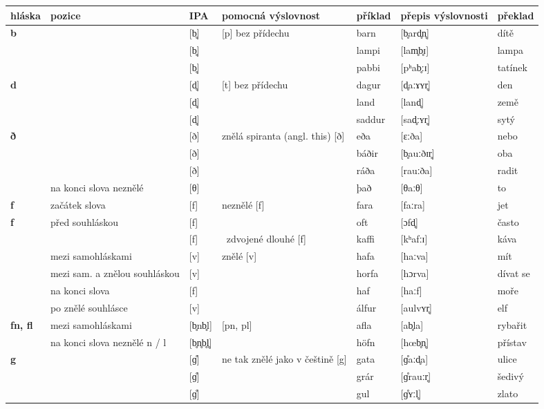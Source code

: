 \begin{longtable}{>{\bfseries}lX>{\IPAfont}lXl>{\IPAfont}ll}
\toprule
  \textbf{hláska} & \textbf{pozice} & \normalfont\textbf{IPA} & \textbf{pomocná výslovnost} & \textbf{příklad} & \normalfont\textbf{přepis výslovnosti} & \textbf{překlad} \\
\midrule
\endhead
b &  & {[b̥]} & [p] bez přídechu & barn & {[b̥ard̥n̥]} & dítě \\ 
 &  & {[b̥]} &   & lampi & {[lam̥b̥ɪ]} & lampa \\ 
 &  & {[b̥]} &   & pabbi & {[pʰab̥ːɪ]} & tatínek \\ 
d &  & {[d̥]} & [t] bez přídechu & dagur & {[d̥aːɤʏr̥]} & den \\ 
 &  & {[d̥]} &   & land & {[land̥]} & země \\ 
 &  & {[d̥]} &   & saddur & {[sad̥ːʏr̥]} & sytý \\ 
ð &  & {[ð]} & znělá spiranta (angl. this) [ð] & eða & {[ɛːða]} & nebo \\ 
 &  & {[ð]} &  & báðir & {[b̥auːðɪr̥]} & oba \\ 
 &  & {[ð]} &   & ráða & {[rauːða]} & radit \\ 
 & na konci slova neznělé  & {[θ]} &   & það & {[θaːθ]} & to \\ 
f  & začátek slova & {[f]} & neznělé [f] & fara & {[faːra]} & jet \\ 
f & před souhláskou & {[f]} &   & oft & {[ɔfd̥]} & často \\ 
 &  & {[f]} &  zdvojené dlouhé [f] & kaffi & {[kʰafːɪ]} & káva \\ 
 & mezi samohláskami & {[v]} & znělé [v] & hafa & {[haːva]} & mít \\ 
 & mezi sam. a znělou souhláskou & {[v]} &   & horfa & {[hɔrva]} & dívat se \\ 
 & na konci slova & {[f]} &   & haf  & {[haːf]} & moře \\ 
 & po znělé souhlásce & {[v]} &   & álfur & {[aulvʏr̥]} & elf \\ 
fn, fl & mezi samohláskami & {[b̥nb̥l]} & [pn, pl] & afla & {[ab̥la]} & rybařit \\ 
 & na konci slova neznělé n / l & {[b̥n̥b̥l̥]} &   & höfn & {[h\oe b̥n̥]} & přístav \\ 
g &  & {[ɡ̊]} & ne tak znělé jako v češtině [g] & gata & {[ɡ̊aːd̥a]} & ulice \\ 
 &  & {[ɡ̊]} &   & grár & {[ɡ̊rauːr̥]} & šedivý \\ 
 &  & {[ɡ̊]} &   & gul & {[ɡ̊ʏːl̥]} & zlato \\ 

\end{longtable}
